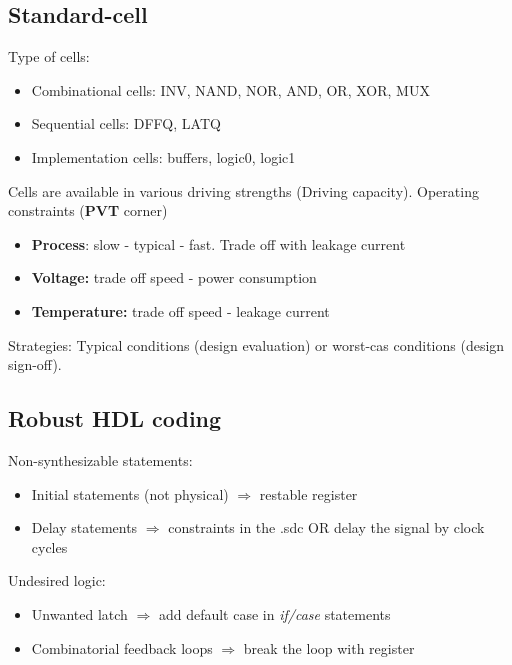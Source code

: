   \subsection{Standard-cell}
  
  Type of cells:
  \begin{itemize}
  \item Combinational cells: INV, NAND, NOR, AND, OR, XOR, MUX
  \item Sequential cells: DFFQ, LATQ
  \item Implementation cells: buffers, logic0, logic1
  \end{itemize}

  Cells are available in various driving strengths (Driving capacity).
\bigbreak
Operating constraints (\textbf{PVT} corner)
\begin{itemize}
  \item \textbf{Process}: slow - typical - fast. Trade off with leakage current
  \item \textbf{Voltage:} trade off speed - power consumption
  \item \textbf{Temperature:} trade off speed - leakage current
\end{itemize}
Strategies: Typical conditions (design evaluation) or worst-cas conditions (design sign-off).

\subsection{Robust HDL coding}
\label{Robust-HDL-coding}
Non-synthesizable statements:
\begin{itemize}
  \item Initial statements (not physical) \(\Rightarrow\) restable register
  \item Delay statements \(\Rightarrow\) constraints in the .sdc OR delay the signal by clock cycles
\end{itemize}

Undesired logic:
\begin{itemize}
  \item Unwanted latch \(\Rightarrow\) add default case in \textit{if/case} statements
  \item Combinatorial feedback loops \(\Rightarrow\) break the loop with register
\end{itemize}


